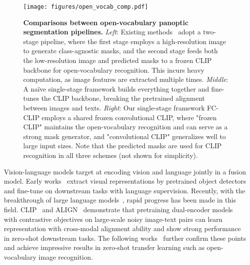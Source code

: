 \documentclass{article}
\newcommand{\modelname}{FC-CLIP\xspace}
\begin{document}
\begin{figure}
    \centering
    \texttt{[image: figures/open\_vocab\_comp.pdf]}
    \caption{
    \textbf{Comparisons between open-vocabulary panoptic segmentation pipelines.}
    \textit{Left}: Existing methods~\cite{ding2022open,xu2023open} adopt a two-stage pipeline, where the first stage employs a high-resolution image to generate class-agnostic masks, and the second stage feeds both the low-resolution image and predicted masks to a frozen CLIP backbone for open-vocabulary recognition. This incurs heavy computation, as image features are extracted multiple times.
    \textit{Middle}: A na\"ive single-stage framework builds everything together and fine-tunes the CLIP backbone, breaking the pretrained alignment between images and texts.
    \textit{Right}: Our single-stage framework \modelname employs a shared frozen convolutional CLIP, where "frozen CLIP" maintains the open-vocabulary recognition and can serve as a strong mask generator, and "convolutional CLIP" generalizes well to large input sizes.
    Note that the predicted masks are used for CLIP recognition in all three schemes (not shown for simplicity).
    }
\label{fig:method_comp}
\end{figure}
Vision-language models target at encoding vision and language jointly in a fusion model. Early works~\cite{tan2019lxmert,chen2020uniter,zhang2021vinvl} extract visual representations by pretrained object detectors and fine-tune on downstream tasks with language supervision. Recently, with the breakthrough of large language models~\cite{devlin2019bert, brown2020language}, rapid progress has been made in this field. CLIP~\cite{radford2021learning} and ALIGN~\cite{jia2021scaling} demonstrate that pretraining dual-encoder models with contrastive objectives on large-scale noisy image-text pairs can learn representation with cross-modal alignment ability and show strong performance in zero-shot downstream tasks. The following works~\cite{yuan2021florence,alayrac2022flamingo,yu2022coca} further confirm these points and achieve impressive results in zero-shot transfer learning such as open-vocabulary image recognition.
\end{document}

